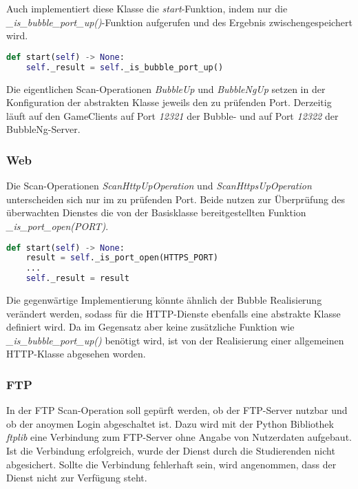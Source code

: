 Auch implementiert diese Klasse die \textit{start}-Funktion, indem nur die \textit{\_is\_bubble\_port\_up()}-Funktion aufgerufen und des Ergebnis zwischengespeichert wird.
\begin{lstlisting}[language=Python, frame=single, caption={Big Brother Bubble Scan-Operation}, captionpos=b, label={lst:bigbrother-bubble-up-start}]
def start(self) -> None:
	self._result = self._is_bubble_port_up()
\end{lstlisting} 

Die eigentlichen Scan-Operationen \textit{BubbleUp} und \textit{BubbleNgUp} setzen in der Konfiguration der abstrakten Klasse jeweils den zu prüfenden Port. Derzeitig läuft auf den GameClients auf Port \textit{12321} der Bubble- und auf Port \textit{12322} der BubbleNg-Server.
\subsubsection{Web}

Die Scan-Operationen \textit{ScanHttpUpOperation} und \textit{ScanHttpsUpOperation} unterscheiden sich nur im zu prüfenden Port. Beide nutzen zur Überprüfung des überwachten Dienstes die von der Basisklasse bereitgestellten Funktion \textit{\_is\_port\_open(PORT)}.

\begin{lstlisting}[language=Python, frame=single, caption={Big Brother HTTP(S) Scan-Operation}, captionpos=b, label={lst:bigbrother-http-up}]
def start(self) -> None:
	result = self._is_port_open(HTTPS_PORT)
	...
	self._result = result
\end{lstlisting} 

Die gegenwärtige Implementierung könnte ähnlich der Bubble Realisierung verändert werden, sodass für die HTTP-Dienste ebenfalls eine abstrakte Klasse definiert wird. Da im Gegensatz aber keine zusätzliche Funktion wie \textit{\_is\_bubble\_port\_up()} benötigt wird, ist von der Realisierung einer allgemeinen HTTP-Klasse abgesehen worden.

\subsubsection{FTP}
In der FTP Scan-Operation soll gepürft werden, ob der FTP-Server nutzbar und ob der anoymen Login abgeschaltet ist. Dazu wird mit der Python Bibliothek \textit{ftplib} eine Verbindung zum FTP-Server ohne Angabe von Nutzerdaten aufgebaut. Ist die Verbindung erfolgreich, wurde der Dienst durch die Studierenden nicht abgesichert. Sollte die Verbindung fehlerhaft sein, wird angenommen, dass der Dienst nicht zur Verfügung steht. 

